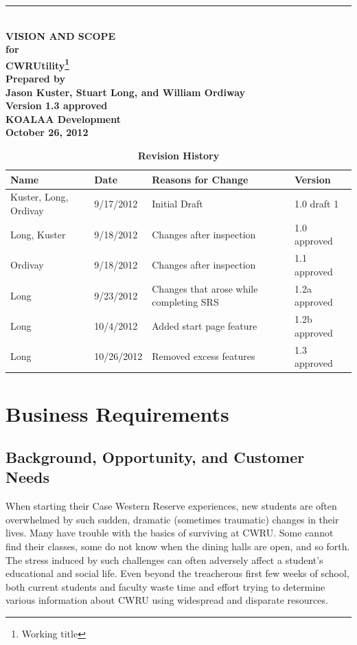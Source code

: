\documentclass[pdftex,12pt,letter]{article}
\newcommand{\HRule}{\rule{\linewidth}{0.5mm}}
\begin{document}
\begin{titlepage}
\begin{flushright}
\HRule \\[0.4cm]
{ \bfseries
{\huge  VISION AND SCOPE\\[1cm]}
{\Large for\\[1cm]}
{\huge CWRUtility\large{\footnote[1]{Working title}}\\[4cm]}
{\large Prepared by\\Jason Kuster, Stuart Long, and William Ordiway\\[1cm]
Version 1.3 approved\\[1cm]
KOALAA Development\\[1cm]
October 26, 2012}}
\end{flushright}
\end{titlepage}
\tableofcontents{}
\begin{table}[!h]
\caption*{\bfseries Revision History}
\begin{tabularx}{\textwidth }[t]{|l|Y|Y|Y|}
\hline
\bfseries Name & \bfseries Date & \bfseries Reasons for Change & \bfseries Version \\ \hline
Kuster, Long, Ordivay & 9/17/2012 & Initial Draft & 1.0 draft 1\\ \hline
Long, Kuster & 9/18/2012 & Changes after inspection & 1.0 approved\\ \hline
Ordivay & 9/18/2012 & Changes after inspection & 1.1 approved\\ \hline
Long & 9/23/2012 & Changes that arose while completing SRS & 1.2a approved\\ \hline
Long & 10/4/2012 & Added start page feature & 1.2b approved\\ \hline
Long & 10/26/2012 & Removed excess features & 1.3 approved\\ \hline
\end{tabularx}
\end{table}
\FloatBarrier
\newpage
\section{Business Requirements}
\subsection{Background, Opportunity, and Customer Needs}
When starting their Case Western Reserve experiences, new students are often overwhelmed by such sudden, dramatic (sometimes traumatic) changes in their lives. Many have trouble with the basics of surviving at CWRU. Some cannot find their classes, some do not know when the dining halls are open, and so forth. The stress induced by such challenges can often adversely affect a student's educational and social life. Even beyond the treacherous first few weeks of school, both current students and faculty waste time and effort trying to determine various information about CWRU using widespread and disparate resources.\\
\end{document}
